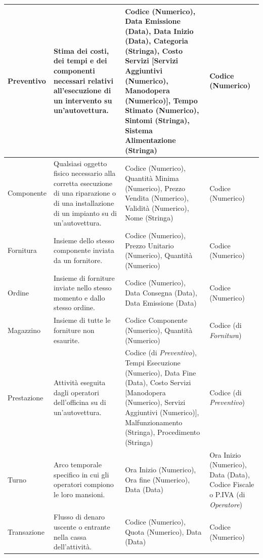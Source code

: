 {\begin{longtable}{| p{2cm} | p{4cm} | p{4cm} | p{2cm} |}
				Preventivo &
				Stima dei costi, dei tempi e dei componenti necessari relativi all’esecuzione di un intervento su un’autovettura. &
				Codice (Numerico), Data Emissione (Data), Data Inizio (Data), Categoria (Stringa), Costo Servizi [Servizi Aggiuntivi (Numerico), Manodopera (Numerico)], Tempo Stimato (Numerico), Sintomi (Stringa), Sistema Alimentazione (Stringa) &
				Codice (Numerico)
				\\ \hline

				Componente &
				Qualsiasi oggetto fisico necessario alla corretta esecuzione di una riparazione o di una installazione di un impianto su di un’autovettura. &
				Codice (Numerico), Quantità Minima (Numerico), Prezzo Vendita (Numerico), Validità (Numerico), Nome (Stringa) &
				Codice (Numerico)
				\\ \hline

				Fornitura &
				Insieme dello stesso componente inviata da un fornitore. &
				Codice (Numerico), Prezzo Unitario (Numerico), Quantità (Numerico) &
				Codice (Numerico)
				\\ \hline

				Ordine &
				Insieme di forniture inviate nello stesso momento e dallo stesso ordine. &
				Codice (Numerico), Data Consegna (Data), Data Emissione (Data) &
				Codice (Numerico)
				\\ \hline
				
				Magazzino &
				Insieme di tutte le forniture non esaurite. &
				Codice Componente (Numerico), Quantità (Numerico) &
				Codice (di \emph{Fornitura})
				\\ \hline

				Prestazione &
				Attività eseguita dagli operatori dell’officina su di un’autovettura. &
				Codice (di \emph{Preventivo}), Tempi Esecuzione (Numerico), Data Fine (Data), Costo Servizi [Manodopera (Numerico), Servizi Aggiuntivi (Numerico)], Malfunzionamento (Stringa), Procedimento (Stringa) &
				Codice (di \emph{Preventivo})
				\\ \hline

				Turno &
				Arco temporale specifico in cui gli operatori compiono le loro mansioni. &
				Ora Inizio (Numerico), Ora fine (Numerico), Data (Data) &
				Ora Inizio (Numerico), Data (Data), Codice Fiscale o P.IVA (di \emph{Operatore})
				\\ \hline

				Transazione &
				Flusso di denaro uscente o entrante nella cassa dell’attività. &
				Codice (Numerico), Quota (Numerico), Data (Data) &
				Codice (Numerico)
				\\ \hline


\end{longtable}}

